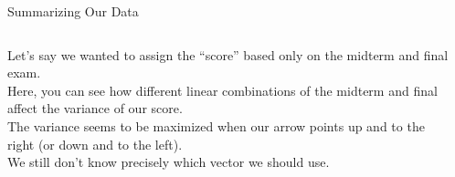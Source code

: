 \documentclass[aspectratio=169]{../latex_main/tntbeamer}  %
\begin{document}
	
	\begin{frame}{Summarizing Our Data}
	    \begin{columns}
	        \begin{column}{.5\textwidth}
	               Let’s say we wanted to assign the “score” based only on the midterm and final exam.\\
	               \bigskip
	               Here, you can see how different linear combinations of the midterm and final affect the variance of our score.\\
	               \bigskip
	               The variance seems to be maximized when our arrow points up and to the right (or down and to the left).\\
	               \bigskip
	               We still don’t know precisely which vector we should use.
	        \end{column}
	        
	        
	        \begin{column}{.5\textwidth}
	        

\end{column}
\end{columns}
\end{frame}
\end{document}
